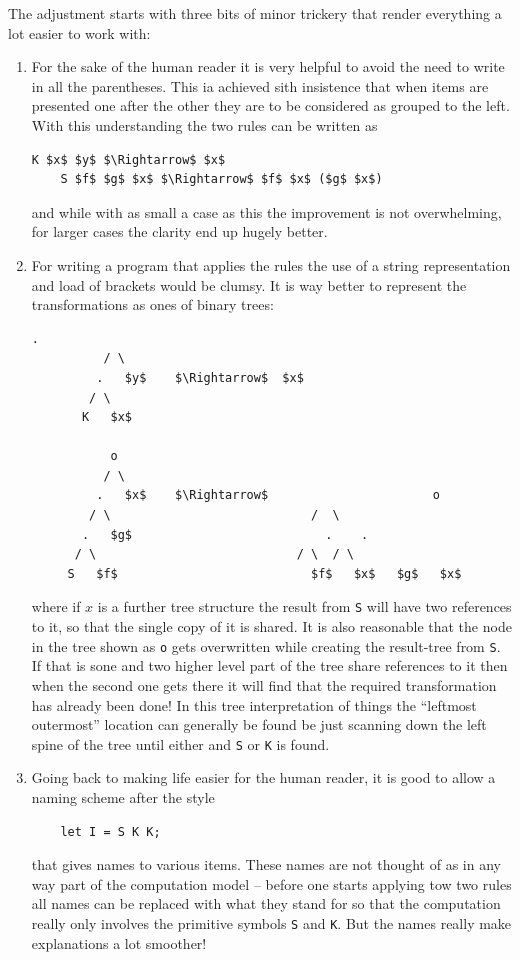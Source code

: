 The adjustment starts with three bits of minor trickery that render everything
a lot easier to work with:
\begin{enumerate}
\item For the sake of the human reader it is very helpful to avoid the need
to write in all the parentheses. This ia achieved sith insistence that
when items are presented one after the other they are to be considered
as grouped to the left. With this understanding the two rules can be written
as
\begin{lstlisting}[mathescape=true]
    K $x$ $y$ $\Rightarrow$ $x$
    S $f$ $g$ $x$ $\Rightarrow$ $f$ $x$ ($g$ $x$)
\end{lstlisting}
and while with as small a case as this the improvement is not overwhelming,
for larger cases the clarity end up hugely better.
\item For writing a program that applies the rules the use of a string
representation and load of brackets would be clumsy. It is way better
to represent the transformations as ones of binary trees:
\begin{lstlisting}[mathescape=true]
           .
          / \
         .   $y$    $\Rightarrow$  $x$
        / \
       K   $x$

           o
          / \
         .   $x$    $\Rightarrow$                       o
        / \                            /  \
       .   $g$                           .    .
      / \                            / \  / \
     S   $f$                           $f$   $x$   $g$   $x$

\end{lstlisting}
where if $x$ is a further tree structure the result from \verb+S+ will
have two references to it, so that the single copy of it is
shared.
It is also reasonable that the node in the tree shown as \verb+o+ gets
overwritten while creating the result-tree from \verb+S+. If that is sone
and two higher level part of the tree share references to it then when the
second one gets there it will find that the required transformation has
already been done!
In this tree interpretation of things the ``leftmost outermost'' location
can generally be found be just scanning down the left spine of the tree
until either and \verb+S+ or \verb+K+ is found.
\item Going back to making life easier for the human reader, it is good to
allow a naming scheme after the style
\begin{verbatim}
    let I = S K K;
\end{verbatim}
that gives names to various items. These names are not thought of as in any
way part of the computation model -- before one starts applying tow two
rules all names can be replaced with what they stand for so that the
computation really only involves the primitive symbols \verb+S+ and
\verb+K+. But the names really make explanations a lot smoother!
\end{enumerate}

